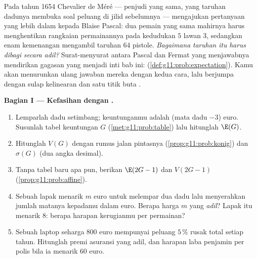 \begin{problem}
\label{pb:g11:prob:1}
Pada tahun 1654 Chevalier de Méré --- penjudi yang sama, yang taruhan dadunya
membuka soal peluang di jilid sebelumnya ---
mengajukan pertanyaan yang lebih dalam kepada Blaise Pascal: dua
pemain yang sama mahirnya harus menghentikan rangkaian permainannya pada
kedudukan $5$ lawan $3$, sedangkan enam kemenangan mengambil taruhan
$64$ pistole. \emph{Bagaimana taruhan itu harus dibagi secara adil?}
Surat-menyurat antara Pascal dan Fermat yang menjawabnya
mendirikan gagasan yang menjadi inti bab ini: 
(\cref{def:g11:prob:expectation}). Kamu akan menurunkan ulang
jawaban mereka dengan kedua cara, lalu berjumpa dengan sulap kelinearan dan
satu titik buta .

\medskip
\noindent\textbf{Bagian I --- Kefasihan dengan .}
\begin{enumerate}
  \item Lemparlah dadu setimbang; keuntunganmu adalah (mata dadu $- 3$) euro.
        Susunlah tabel  keuntungan $G$
        (\cref{met:g11:prob:table}) lalu hitunglah $\E(G)$.
  \item Hitunglah $V(G)$ dengan rumus jalan pintasnya
        (\cref{prop:g11:prob:konig}) dan $\sigma(G)$ (dua
        angka desimal).
  \item Tanpa tabel baru apa pun, berikan $\E(2G - 1)$ dan
        $V(2G - 1)$ (\cref{prop:g11:prob:affine}).
  \item Sebuah lapak menarik $m$ euro untuk melempar dua dadu lalu
        menyerahkan jumlah matanya kepadamu dalam euro. Berapa harga
        $m$ yang \emph{adil}? Lapak itu menarik $8$: berapa harapan kerugianmu
        per permainan?
  \item Sebuah laptop seharga $800$ euro mempunyai peluang $5\,\%$
        rusak total setiap tahun. Hitunglah premi asuransi yang adil,
        dan harapan laba penjamin per polis
        bila ia menarik $60$ euro.
\end{enumerate}


\end{problem}
